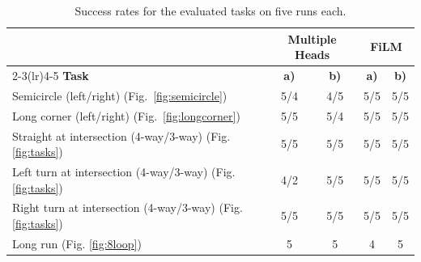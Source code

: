 \begin{table}[t]
\centering
\caption{Success rates for the evaluated tasks on five runs each.}
\label{tab:results}

\small
\setlength{\tabcolsep}{3pt} %

\begin{tabular}{lcccc}
\toprule
&
\multicolumn{2}{c}{\textbf{Multiple Heads}} &
\multicolumn{2}{c}{\textbf{FiLM}} \\
\cmidrule(lr){2-3}\cmidrule(lr){4-5}
\textbf{Task} &
\textbf{a)} &
\textbf{b)} &
\textbf{a)} &
\textbf{b)} \\
\midrule

Semicircle (left/right) (Fig.~\ref{fig:semicircle}) & 5/4 & 4/5 & 5/5 & 5/5 \\
Long corner (left/right) (Fig.~\ref{fig:longcorner})   & 5/5 & 5/4 & 5/5 & 5/5 \\
Straight at intersection (4-way/3-way) (Fig. \ref{fig:tasks}) & 5/5 & 5/5 & 5/5 & 5/5 \\
Left turn at intersection (4-way/3-way) (Fig. \ref{fig:tasks}) & 4/2 & 5/5 & 5/5 & 5/5 \\
Right turn at intersection (4-way/3-way) (Fig. \ref{fig:tasks}) & 5/5 & 5/5 & 5/5 & 5/5 \\
Long run (Fig. \ref{fig:8loop}) & 5 & 5 & 4 & 5 \\

\bottomrule
\end{tabular}
\end{table}